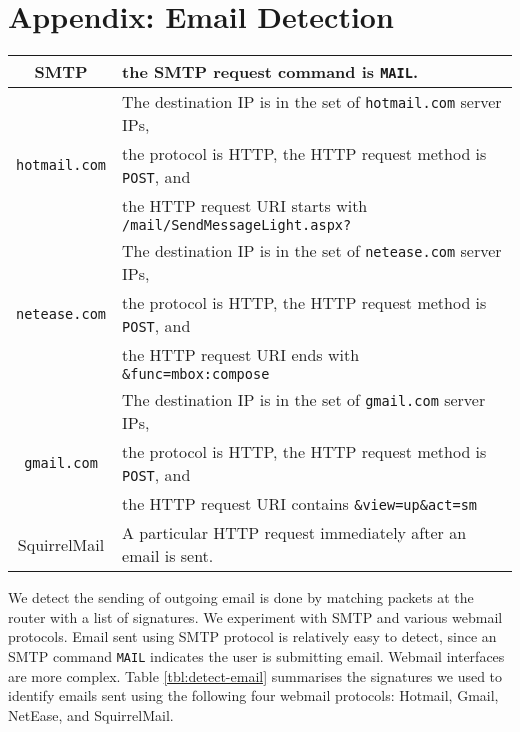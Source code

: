 \section*{Appendix: Email Detection}
\label{appendix:email}

\begin{table*}[bt]
  \centering
  \begin{tabular}{|c|l|}
  \hline
  SMTP     & the SMTP request command is {\tt MAIL}. \\
  \hline
           & The destination IP is in the set of {\tt hotmail.com} server IPs,  \\
  {\tt hotmail.com}  & the protocol is HTTP,
           the HTTP request method is {\tt POST}, and \\
           & the HTTP request URI starts with {\tt /mail/SendMessageLight.aspx?} \\
  \hline
           & The destination IP is in the set of {\tt netease.com} server IPs, \\
  {\tt netease.com}  & the protocol is HTTP,
           the HTTP request method is {\tt POST}, and \\
           & the HTTP request URI ends with {\tt \&func=mbox:compose} \\
  \hline
           & The destination IP is in the set of {\tt gmail.com} server IPs, \\
  {\tt gmail.com}    & the protocol is HTTP,
           the HTTP request method is {\tt POST}, and \\
           & the HTTP request URI contains {\tt \&view=up\&act=sm} \\
  \hline
  SquirrelMail & A particular HTTP request immediately after an email is sent. \\ [0.5ex]
  \hline
  \end{tabular}
  \caption{Rules for email detection. }\label{tbl:detect-email}
\end{table*}

We detect the sending of outgoing email is done by matching packets 
at the router with a list of signatures. 
We experiment with SMTP and various webmail protocols.
Email sent using SMTP protocol is relatively easy to detect, since
an SMTP command {\tt MAIL} indicates the user is submitting email.
Webmail interfaces are more complex.
Table \ref{tbl:detect-email} summarises
the signatures we used to identify emails sent using the following
four webmail protocols: Hotmail, Gmail, NetEase, and SquirrelMail.


